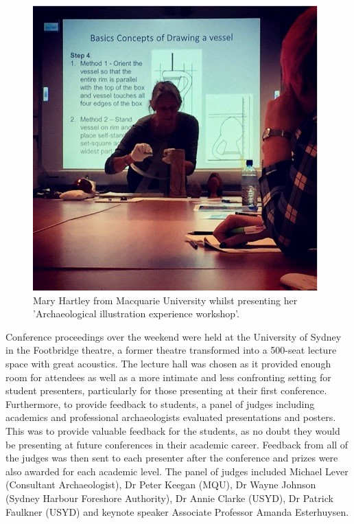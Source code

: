 \begin{figure}
	\includegraphics[width=.6\linewidth]{figures/NASC_Fig3}
	\centering
	\caption{Mary Hartley from Macquarie University whilst presenting her 'Archaeological illustration experience workshop'.}
	\label{fig:NASC_Fig3}
\end{figure}	
	
Conference proceedings over the weekend were held at the University of Sydney in the Footbridge theatre, a former theatre transformed into a 500-seat lecture space with great acoustics. The lecture hall was chosen as it provided enough room for attendees as well as a more intimate and less confronting setting for student presenters, particularly for those presenting at their first conference. Furthermore, to provide feedback to students, a panel of judges including academics and professional archaeologists evaluated presentations and posters. This was to provide valuable feedback for the students, as no doubt they would be presenting at future conferences in their academic career. Feedback from all of the judges was then sent to each presenter after the conference and prizes were also awarded for each academic level. The panel of judges included Michael Lever (Consultant Archaeologist), Dr Peter Keegan (MQU), Dr Wayne Johnson (Sydney Harbour Foreshore Authority), Dr Annie Clarke (USYD), Dr Patrick Faulkner (USYD) and keynote speaker Associate Professor Amanda Esterhuysen. 

